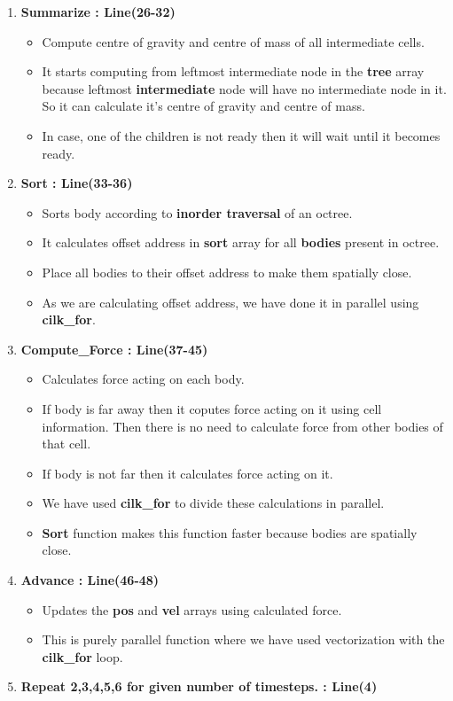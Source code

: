 \documentclass{article}
\begin{document}
\begin{enumerate}
\item \textbf{Summarize : Line(26-32)}
\begin{itemize}
\item Compute centre of gravity and centre of mass of all intermediate cells.
\item It starts computing from leftmost intermediate node in the \textbf{tree} array because leftmost \textbf{intermediate} node will have no intermediate node in it. So it can calculate it's centre of gravity and centre of mass.
\item In case, one of the children is not ready then it will wait until it becomes ready.
\end{itemize}

\item \textbf{Sort : Line(33-36)}
\begin{itemize}
\item Sorts body according to \textbf{inorder traversal} of an octree.
\item It calculates offset address in \textbf{sort} array for all \textbf{bodies} present in octree. 
\item Place all bodies to their offset address to make them spatially close.
\item As we are calculating offset address, we have done it in parallel using \textbf{cilk\_for}.  
\end{itemize}

\item \textbf{Compute\_Force : Line(37-45)}
\begin{itemize}
\item Calculates force acting on each body.
\item If body is far away then it coputes force acting on it using cell information. Then there is no need to calculate force from other bodies of that cell.
\item If body is not far then it calculates force acting on it.
\item We have used \textbf{cilk\_for} to divide these calculations in parallel. 
\item \textbf{Sort} function makes this function faster because bodies are spatially close.
\end{itemize}

\item \textbf{Advance : Line(46-48)}
\begin{itemize}
\item Updates the \textbf{pos} and \textbf{vel} arrays using calculated force.
\item This is purely parallel function where we have used vectorization with the \textbf{cilk\_for} loop.
\end{itemize}

\item \textbf{Repeat 2,3,4,5,6 for given number of timesteps. : Line(4)}

\end{enumerate}
\end{document}

